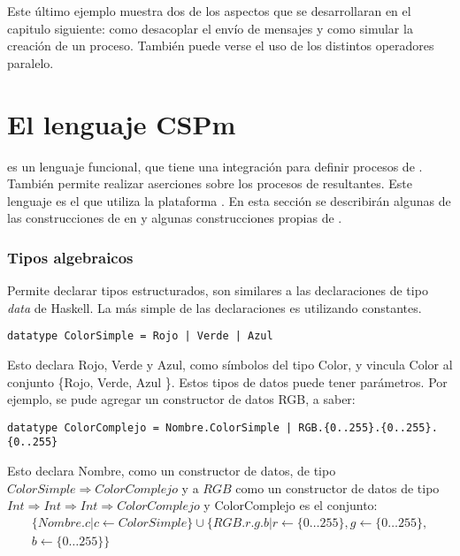 Este último ejemplo muestra dos de los aspectos que se desarrollaran en el capitulo siguiente: como desacoplar el envío de mensajes y como simular la creación de un proceso. También puede verse el uso de los distintos operadores paralelo.
 
\section{El lenguaje CSPm}

\CSPm es un lenguaje funcional, que tiene una integración para definir procesos de \CSP. También permite realizar aserciones sobre los procesos de \CSP resultantes. Este lenguaje es el que utiliza la plataforma \FDR. En esta sección se describirán algunas de las construcciones de \CSP en \CSPm y algunas construcciones propias de \CSPm.

\subsubsection{Tipos algebraicos}

Permite declarar tipos estructurados, son similares a las declaraciones de tipo \textit{data} de Haskell. La más simple de las declaraciones es utilizando constantes.

\begin{lstlisting}[language=cspm, style=sinnumeros]
datatype ColorSimple = Rojo | Verde | Azul
\end{lstlisting}

Esto declara Rojo, Verde y Azul, como símbolos del tipo Color, y vincula Color al conjunto \{Rojo, Verde, Azul \}. Estos tipos de datos puede tener parámetros. Por ejemplo, se pude agregar un constructor de datos RGB, a saber:

\begin{lstlisting}[language=cspm, style=sinnumeros]
datatype ColorComplejo = Nombre.ColorSimple | RGB.{0..255}.{0..255}.{0..255}
\end{lstlisting}

Esto declara Nombre, como un constructor de datos, de tipo $ColorSimple \Rightarrow ColorComplejo$ y a $RGB$ como un constructor de datos de  tipo $Int \Rightarrow Int \Rightarrow Int \Rightarrow ColorComplejo$ y ColorComplejo es el conjunto:
\begin{multline*}
\{ Nombre.c | c \leftarrow  ColorSimple \} \cup \{ RGB.r.g.b |  r \leftarrow \{ 0 \dots 255 \},  g \leftarrow \{ 0 \dots 255 \}, \\  b \leftarrow \{ 0 \dots 255 \} \}  
\end{multline*}

